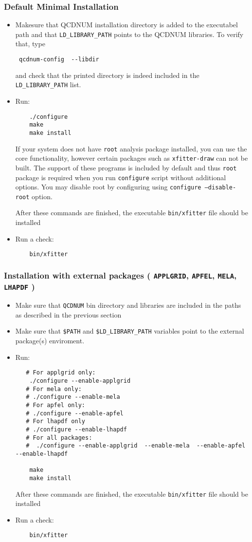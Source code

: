 \subsubsection{Default Minimal Installation}
\begin{itemize}
\item
 Makesure that QCDNUM installation directory is added to the executabel
 path and that {\tt LD\_LIBRARY\_PATH} points to the QCDNUM libraries.
 To verify that, type
\begin{verbatim}
 qcdnum-config  --libdir
\end{verbatim}
and check that the printed directory is indeed included in the {\tt LD\_LIBRARY\_PATH} list.

\item Run:
\begin{verbatim}
    ./configure
    make 
    make install
\end{verbatim}
If your system does not have {\tt root} analysis package installed, you can use the {\fitter} core functionality, however certain packages such as {\tt xfitter-draw} 
can not be built. The support of these programs is included by default and thus 
{\tt root} package is required when you run {\tt configure} script without 
additional options. You may disable root by configuring using 
{\tt configure --disable-root} option.


After these commands are finished, the executable {\tt bin/xfitter} 
file should be installed
\item  Run a check:
\begin{verbatim}
    bin/xfitter 
\end{verbatim}
\end{itemize}
\subsubsection{Installation with external packages
( {\tt APPLGRID}, {\tt APFEL}, {\tt MELA}, {\tt LHAPDF} )}
\begin{itemize}
\item Make sure that {\tt QCDNUM} bin directory and libraries are included
in the paths as described in the previous section
\item Make sure that {\tt \$PATH} and {\tt \$LD\_LIBRARY\_PATH} 
variables point to the external package(s) enviroment.
\item Run:
\begin{verbatim}
   # For applgrid only:
    ./configure --enable-applgrid 
   # For mela only:  
   # ./configure --enable-mela 
   # For apfel only:
   # ./configure --enable-apfel
   # For lhapdf only 
   # ./configure --enable-lhapdf
   # For all packages:
   #  ./configure --enable-applgrid  --enable-mela  --enable-apfel  --enable-lhapdf

    make 
    make install
\end{verbatim}
After these commands are finished, the executable {\tt bin/xfitter} 
file should be installed
\item  Run a check:
\begin{verbatim}
    bin/xfitter 
\end{verbatim}
\end{itemize}


